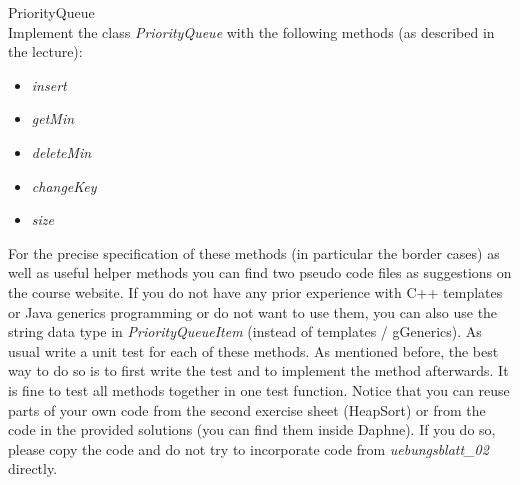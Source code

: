  PriorityQueue \\
Implement the class \textit{PriorityQueue} with the following methods
(as described in the lecture):
\begin{itemize}
  \item\textit{insert} 
  \item\textit{getMin} 
  \item\textit{deleteMin} 
  \item\textit{changeKey} 
  \item\textit{size} 
\end{itemize}
For the precise specification of these methods
(in particular the border cases)
as well as useful helper methods you can find two pseudo code files as 
suggestions on the course website.
If you do not have any prior experience with C++ templates or Java generics
programming or do not want to use them,
you can also use the string data type in \textit{PriorityQueueItem}
(instead of templates / gGenerics).
As usual write a unit test for each of these methods.
As mentioned before, the best way to do so is to first write the test and to
implement the method afterwards.
It is fine to test all methods together in one test function.
Notice that you can reuse parts of your own code from the second exercise sheet
(HeapSort) or from the code in the provided solutions
(you can find them inside Daphne).
If you do so, please copy the code and do not try to incorporate code from
\textit{uebungsblatt\_02} directly.